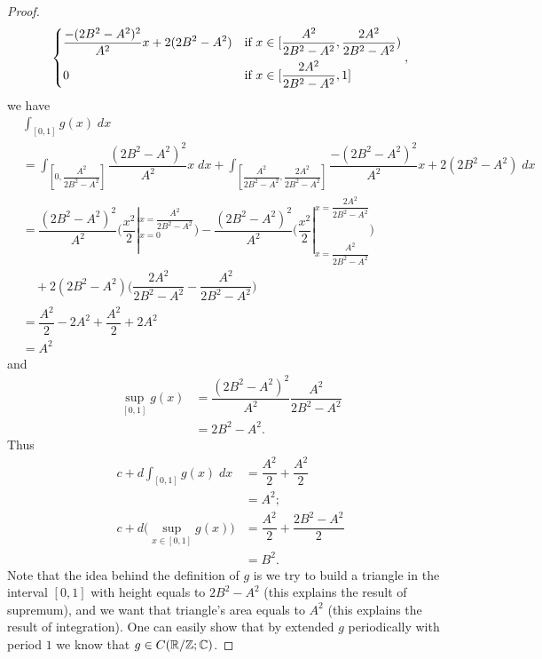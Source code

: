 \begin{proof}
\begin{align*}
\begin{dcases}
                                      \dfrac{-(2 B^2 - A^2)^2}{A^2} x + 2 (2 B^2 - A^2) & \text{if } x \in [\dfrac{A^2}{2 B^2 - A^2}, \dfrac{2 A^2}{2 B^2 - A^2}) \\
                                      0                                                 & \text{if } x \in [\dfrac{2 A^2}{2 B^2 - A^2}, 1]
                                    \end{dcases},
  \end{align*}
  we have
  \begin{align*}
     & \int_{[0, 1]} g(x) \; dx                                                                                                                                                                                                     \\
     & = \int_{[0, \dfrac{A^2}{2 B^2 - A^2}]} \dfrac{(2 B^2 - A^2)^2}{A^2} x \; dx + \int_{[\dfrac{A^2}{2 B^2 - A^2}, \dfrac{2 A^2}{2 B^2 - A^2}]} \dfrac{-(2 B^2 - A^2)^2}{A^2} x + 2 (2 B^2 - A^2) \; dx                          \\
     & = \dfrac{(2 B^2 - A^2)^2}{A^2} \bigg(\dfrac{x^2}{2}|_{x = 0}^{x = \dfrac{A^2}{2 B^2 - A^2}}\bigg) - \dfrac{(2 B^2 - A^2)^2}{A^2} \bigg(\dfrac{x^2}{2}|_{x = \dfrac{A^2}{2 B^2 - A^2}}^{x = \dfrac{2 A^2}{2 B^2 - A^2}}\bigg) \\
     & \quad + 2 (2 B^2 - A^2) \bigg(\dfrac{2 A^2}{2 B^2 - A^2} - \dfrac{A^2}{2 B^2 - A^2}\bigg)                                                                                                                                    \\
     & = \dfrac{A^2}{2} - 2 A^2 + \dfrac{A^2}{2} + 2 A^2                                                                                                                                                                            \\
     & = A^2
  \end{align*}
  and
  \begin{align*}
    \sup_{[0, 1]} g(x) & = \dfrac{(2 B^2 - A^2)^2}{A^2} \dfrac{A^2}{2 B^2 - A^2} \\
                       & = 2 B^2 - A^2.
  \end{align*}
  Thus
  \begin{align*}
    c + d \int_{[0, 1]} g(x) \; dx           & = \dfrac{A^2}{2} + \dfrac{A^2}{2}         \\
                                             & = A^2;                                    \\
    c + d \big(\sup_{x \in [0, 1]} g(x)\big) & = \dfrac{A^2}{2} + \dfrac{2 B^2 - A^2}{2} \\
                                             & = B^2.
  \end{align*}
  Note that the idea behind the definition of \(g\) is we try to build a triangle in the interval \([0, 1]\) with height equals to \(2 B^2 - A^2\) (this explains the result of supremum), and we want that triangle's area equals to \(A^2\) (this explains the result of integration).
  One can easily show that by extended \(g\) periodically with period \(1\) we know that \(g \in C(\mathbb{R} / \mathbb{Z} ; \mathbb{C})\).
\end{proof}

